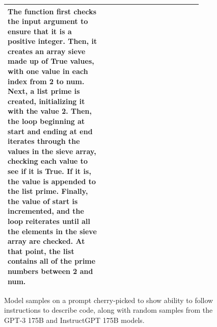 \documentclass{article}
\begin{document}
\begin{figure}[hp]
\begin{tabular}{p{0.45\linewidth} p{0.45\linewidth}}
The function first checks the input argument to ensure that it is a positive integer. Then, it creates an array sieve made up of True values, with one value in each index from 2 to num. Next, a list prime is created, initializing it with the value 2. Then, the loop beginning at start and ending at end iterates through the values in the sieve array, checking each value to see if it is True. If it is, the value is appended to the list prime. Finally, the value of start is incremented, and the loop reiterates until all the elements in the sieve array are checked. At that point, the list contains all of the prime numbers between 2 and num. \\
         \bottomrule
    \end{tabular}
    \caption{Model samples on a prompt cherry-picked to show ability to follow instructions to describe code, along with random samples from the GPT-3 175B and InstructGPT 175B models.}
    \label{fig:qual_apdx_3}
\end{figure}
\end{document}
